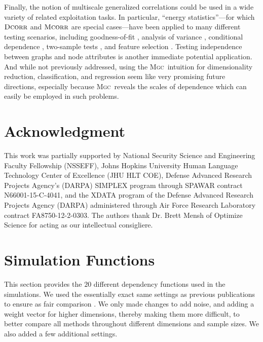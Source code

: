 \documentclass[11pt]{article}
\newcommand{\note}[2][]{\added[#1,remark={#2}]{}}
\providecommand{\sct}[1]{{\normalfont\textsc{#1}}}
\newcommand{\Mgc}{\sct{Mgc}}
\newcommand{\Dcorr}{\sct{Dcorr}}
\newcommand{\Mcorr}{\sct{Mcorr}}
\newcommand{\jv}[1]{{\note{jv: #1}}}
\newcommand{\cs}[1]{{\note{cs: #1}}}
\begin{document}
Finally, the notion of multiscale generalized correlations could be used in a wide variety of related exploitation tasks.  In particular, ``energy statistics''---for which $\Dcorr$ and $\Mcorr$ are special cases---have been applied to many different testing scenarios, including goodness-of-fit  \cite{Szekely2005}, analysis of variance  \cite{Rizzo2010}, conditional dependence  \cite{Szekely2014,Wang2015},  two-sample tests \cite{Szekely2004}, and feature selection \cite{LiZhongZhu2012,Zhong2015}.   
Testing independence between graphs and node attributes \cite{Fosdick2015} is another immediate potential application.  And while not previously addressed, using the \Mgc~intuition for dimensionality reduction, classification, and regression seem like very promising future directions, especially because \Mgc~reveals the scales of dependence which can easily be employed in such problems.

\cs{should we say something about that multiscale oracle methods will always, by definition, dominate, but our empirical investigations demonstrate that our non-oracle approach also dominates?}
\jv{yes, let us add it anywhere you see fit?}

\clearpage
\pagestyle{plain}




\section*{Acknowledgment}
This work was partially supported by
%
National Security Science and Engineering Faculty Fellowship (NSSEFF),
%
Johns Hopkins University Human Language Technology Center of Excellence (JHU HLT COE),
%
Defense Advanced Research Projects Agency's (DARPA) SIMPLEX program through SPAWAR contract N66001-15-C-4041,
%
and the XDATA program of the Defense Advanced Research Projects Agency (DARPA) administered through Air Force Research Laboratory contract FA8750-12-2-0303. The authors thank Dr. Brett Mensh of Optimize Science for acting as our intellectual consigliere.


\clearpage
\appendix
\setcounter{figure}{0}
\renewcommand\thefigure{A\arabic{figure}}

\section{Simulation Functions}
\label{appen:function}

This section provides the $20$ different dependency functions used in the simulations.  We used the essentially exact same settings as previous publications to ensure as fair comparison \cite{SzekelyRizzoBakirov2007, SimonTibshirani2012, SimonTibshirani2012, GorfineHellerHeller2012}.  We only made changes to add noise, and adding a weight vector for higher dimensions, thereby making them more difficult, to better compare all methods throughout different dimensions and sample sizes. We also added a few additional settings.
\end{document}

